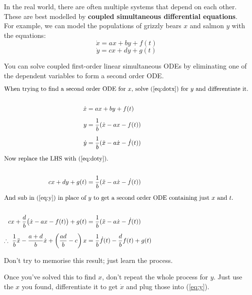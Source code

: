 \documentclass[../main.tex]{subfile}
\begin{document}

In the real world, there are often multiple systems that depend on each other. These are best modelled by \textbf{coupled simultaneous differential equations}. For example, we can model the populations of grizzly bears $x$ and salmon $y$ with the equations:
\begin{equation}
	\dot{x} = ax + by + f(t)\label{eq:dotx}
\end{equation}
\begin{equation}
	\dot{y} = cx + dy + g(t)\label{eq:doty}
\end{equation}

You can solve coupled first-order linear simultaneous ODEs by eliminating one of the dependent variables to form a second order ODE.
\begin{align}
	\intertext{When trying to find a second order ODE for $x$, solve (\ref{eq:dotx}) for $y$ and differentiate it.}\nonumber\\
	\dot{x} &= ax + by + f(t)\nonumber\\[1.2ex]
	y &= \frac{1}{b}(\dot{x} - ax - f(t))\label{eq:y}\\[1.2ex]
	\dot{y} &= \frac{1}{b}(\ddot{x} - a\dot{x} - \dot{f}(t))\nonumber\\[1.2ex]%
%
	\intertext{Now replace the LHS with (\ref{eq:doty}).}\nonumber\\
	cx + dy + g(t) &= \frac{1}{b}(\ddot{x} - a\dot{x} - \dot{f}(t))\nonumber\\[1.2ex]%
%
	\intertext{And sub in (\ref{eq:y}) in place of $y$ to get a second order ODE containing just $x$ and $t$.}\nonumber\\
	cx + \frac{d}{b}\big(\dot{x} - ax - f(t)\big) + g(t) &=
		\frac{1}{b}(\ddot{x} - a\dot{x} - \dot{f}(t))\nonumber\\[1.2ex]
	\therefore\ \frac{1}{b}\ddot{x} - \frac{a + d}{b}\dot{x} + \left(\frac{ad}{b} - c\right)x &=
		\frac{1}{b} \dot{f}(t) - \frac{d}{b}f(t) + g(t)\nonumber
\end{align}

Don't try to memorise this result; just learn the process.

Once you've solved this to find $x$, don't repeat the whole process for $y$. Just use the $x$ you found, differentiate it to get $\dot{x}$ and plug those into (\ref{eq:y}).
\end{document}
